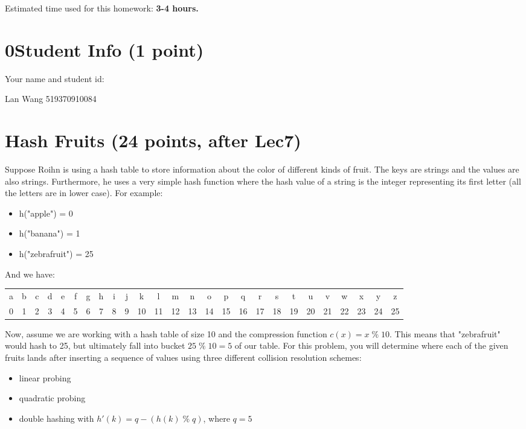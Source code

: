\documentclass[11pt]{exam}
\begin{document}
Estimated time used for this homework: \textbf{3-4 hours.}

\newpage
\section*{0\quad Student Info (1 point)}
Your name and student id:
\begin{solution}
Lan Wang 519370910084
\end{solution}

\section{Hash Fruits (24 points, after Lec7)}
Suppose Roihn is using a hash table to store information about the color of different kinds of fruit. The keys are strings and the values are also strings. Furthermore, he uses a very simple hash function where the hash value of a string is the integer representing its first letter (all the letters are in lower case). For example:
\begin{itemize}
\item h("apple") = 0
\item h("banana") = 1
\item h("zebrafruit") = 25
\end{itemize}

And we have:
\begin{table}[H]
\centering
\setlength{\tabcolsep}{1mm}
\begin{tabular}{cccccccccccccccccccccccccc}
a&b&c&d&e&f&g&h&i&j&k&l&m&n&o&p&q&r&s&t&u&v&w&x&y&z\\
0&1&2&3&4&5&6&7&8&9&10&11&12&13&14&15&16&17&18&19&20&21&22&23&24&25
\end{tabular}
\end{table}
Now, assume we are working with a hash table of size 10 and the compression function $c(x) = x \;\%\; 10$. This means that "zebrafruit" would hash to 25, but ultimately fall into bucket $25 \;\%\; 10 = 5$ of our table. For this problem, you will determine where each of the given fruits lands after inserting a sequence of values using three different collision resolution schemes:

\begin{itemize}
\item linear probing
\item quadratic probing
\item double hashing with $h'(k) = q - (h(k) \;\%\; q)$, where $q=5$
\end{itemize}
\end{document}
